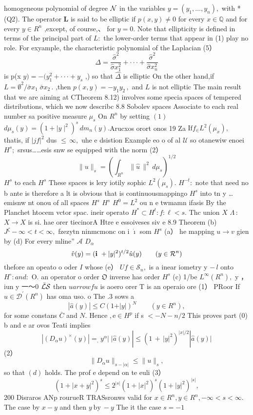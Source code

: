 homogeneous polynomial of degree ${\cal N}$ in the variables $y=(y_{1},\ldots,y_{n}),$ with *(Q2). The operator ${\boldsymbol{L}}$ is said to be elliptic if $p(x,y)\neq0$ for every $x\in\mathbb{Q}$ and for every $y\in R^{n}$ ,except, of course,、 for $y=0.$ Note that ellipticity is defined in terms of the principal part of $L{\mathord{}}:$ the lower-order terms that appear in (1) play no role. For exyample, the characteristic polynomial of the Laplacian (5） $$ \Delta={\frac{{\hat{\sigma}}^{2}}{{\hat{\sigma}}x_{1}^{2}}}+\cdot\cdot\cdot+{\frac{{\hat{\sigma}}^{2}}{{\hat{\sigma}}x_{n}^{2}}} $$ is p(x $y)=-(y_{1}^{2}+\cdot\cdot\cdot+y_{s}$ ,) so that $\hat{\Delta}$ is elliptic On the other hand,if $L=\emptyset^{2}/\bar{\sigma}x_{1}\;\bar{\sigma}x_{2}\,.$ ,then $p(x,y)=-y_{1}y_{2}\,,$ and $\boldsymbol{\mathit{L}}$ is not elliptic The main result that we are aiming at CTheorem 8.12) involves some specia spaces of tempered distributions, which we now describc 8.8 Sobolev spaces Associate to each real number sa positive measure $\mu_{s}$ On $R^{n}$ by setting $\operatorname{\mathcal{(1)}}$ $d\mu_{s}(y)=(1+\mid y\mid^{2})^{s}\,d m_{n}(y).$Arucxos orort onos 19 Za ${\mathrm{If}}f_{\in}L^{2}(\mu_{x}),$ thatis, if $|j f|^{2}$ dus ${}\leq\,\infty,$ uhe e dsistion Example eo o of al ${\mathcal{U}}$ so otanewiw enoei $H^{s};$ srsus……esis snw se equipped with the norm (2） $$ \|u\|_{s}=\left(\int_{R^{n}}\|{\hat{u}}\,\|^{2}\,d\mu_{s}\right)^{1/2} $$ $H^{s}$ to each $H^{s}$ These spaces is lery iotily sophic $L^{2}(\mu_{s}).$ $\textstyle H^{-t}\!:$ note that need no b ante is therefore a lt is obvious that is continuousmappingo $H^{s}$ into tn y … emisnw nt onou of all spaces $H^{s}$ $H^{s}$ $H^{0}=L^{2}$ ou n e twmamn ifasis By the Planchet htocem vctor spac. ineir operato $H^{*}\subset H^{t}:f\colon\ell<s.$ Thc union $\textstyle X$ $\Lambda\,:$ $X\to X$ is si. hae orer tiecinorA Htre e essoiveses siv e 8.9 Theorem (b) $J^{\zeta}-\infty<t<\infty,$ fzezytn ninmcmonc on i $\dot{\boldsymbol{\imath}}$ som $H^{s}$ (a） he mapping $u\to v$ gien by (d) For every mline” $\scriptstyle{\mathcal{A}}$ $D_{\alpha}$ $$ \hat{v}(y)=({\bf i}\ +\vert y\vert^{2})^{t/2}\hat{u}(y)\qquad(y\in{\cal R}^{n}) $$ thefore an opeato o oder ${\mathbf{}}I$ whose (e） $U f\in{\mathcal{S}}_{n},$ is a inear iometry y $-\,l$ onto $H^{\circ}:a n d:$ ${\boldsymbol{\mathrm{O}}}.$ an operator o order ${\mathfrak{O}}$ inverse has order $H^{s}$ (c) 1/be $L^{\infty}(R^{n}),$ y ， iun y 一～0 $\bar{\cal L}{\cal S}$ then $u arrow f u$ is aoero orer T is an operaio ore (1） PRoor If $u\in{\mathcal{D}}^{\prime}(R^{n})$ has oma uso. o The .3 sows a $$ |\hat{a}(y)|\leq C(1+\vert y\vert)^{N}\qquad(y\in R^{n}), $$ for some constans $\textstyle{\bar{C}}$ and $N.$ Hence ${\mathrm{,e}}\in H^{p}$ if s $<-N-n/2$ This proves part (0) b and e ar ovos Teati implies $$ |(D_{\alpha}u)^{\times}(y)|=_{,}y^{\alpha}|\;|\hat{a}(y)|\leq(1\,+\,|y|^{2})^{|x|/2}|\hat{a}(y)| $$ (2） $$ \|D_{\alpha}u\|_{s-|\alpha|}\leq\|u\|_{s}, $$ so that $(d)$ holds. The prof e depend on te euli (3） $$ (1+|x+y|^{2})^{s}\leq2^{|s|}(1+|x|^{2})^{s}(1+|y|^{2})^{|s|}, $$200 Disraros ANp rourueR TRASsronws valid for $x\in R^{n},y\in R^{n},-\infty<s<\infty.$ The case by $x-y$ and then $y\ {\mathrm{by}}\ -y$ The it the case $s=-1$ 